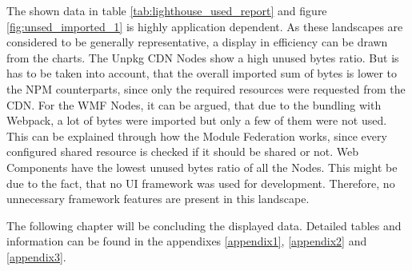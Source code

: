 \normalsize
The shown data in table \ref{tab:lighthouse_used_report} and figure \ref{fig:unsed_imported_1} is highly application dependent. As these landscapes are considered to be generally representative, a display in efficiency can be drawn from the charts.
The Unpkg CDN Nodes show a high unused bytes ratio. But is has to be taken into account, that the overall imported sum of bytes is lower to the NPM counterparts, since only the required resources were requested from the CDN.
For the WMF Nodes, it can be argued, that due to the bundling with Webpack, a lot of bytes were imported but only a few of them were not used. This can be explained through how the Module Federation works, since every configured shared resource is checked if it should be shared or not.
Web Components have the lowest unused bytes ratio of all the Nodes. This might be due to the fact, that no UI framework was used for development. Therefore, no unnecessary framework features are present in this landscape.

The following chapter will be concluding the displayed data. Detailed tables and information can be found in the appendixes \ref{appendix1}, \ref{appendix2} and \ref{appendix3}.
